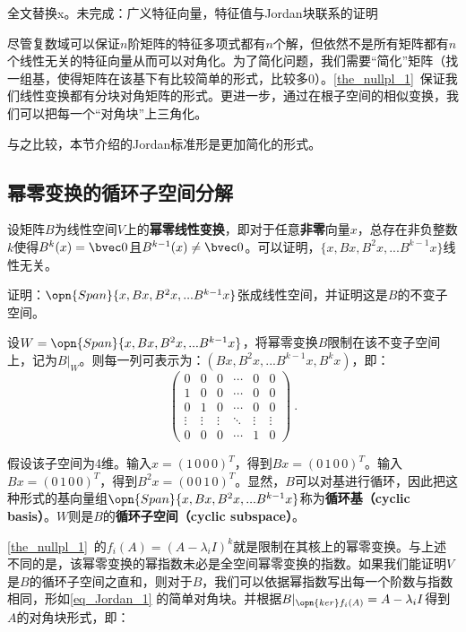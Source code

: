 

\begin{issues}
\issueDraft 全文替换x。未完成：广义特征向量，特征值与Jordan块联系的证明
\end{issues}

尽管复数域可以保证$n$阶矩阵的特征多项式都有$n$个解，但依然不是所有矩阵都有$n$个线性无关的特征向量从而可以对角化。为了简化问题，我们需要“简化”矩阵（找一组基，使得矩阵在该基下有比较简单的形式，比较多$0$）。\autoref{the_nullpl_1}~保证我们线性变换都有分块对角矩阵的形式。更进一步，通过在根子空间的相似变换，我们可以把每一个“对角块”上三角化。

与之比较，本节介绍的Jordan标准形是更加简化的形式。
\subsection{幂零变换的循环子空间分解}
设矩阵$B$为线性空间$V$上的\textbf{幂零线性变换}，即对于任意\textbf{非零}向量$x$，总存在非负整数$k$使得$B^{k}(x)=\bvec 0$且$B^{k-1}(x)\neq \bvec 0$。可以证明，$\{x,Bx,B^2x,...B^{k-1}x\}$线性无关。
\begin{exercise}{}
证明：$\opn{Span}\{x,Bx,B^2x,...B^{k-1}x\}$张成线性空间，并证明这是$B$的不变子空间。
\end{exercise}
设$W=\opn{Span}\{x,Bx,B^2x,...B^{k-1}x\}$，将幂零变换$B$限制在该不变子空间上，记为$B|_W$。则每一列可表示为：$(Bx,B^2x,...B^{k-1}x,B^kx)$，即：
\begin{equation}\label{eq_Jordan_1}
\left(\begin{array}{cccccc}
0 & 0 & 0 & \cdots & 0 & 0 \\
1 & 0 & 0 & \cdots & 0 & 0 \\
0 & 1 & 0 & \cdots & 0 & 0 \\
\vdots & \vdots & \vdots & \ddots & \vdots & \vdots \\
0 & 0 & 0 & \cdots & 1 & 0
\end{array}\right)~.
\end{equation}

假设该子空间为4维。输入$x=(1\,0\,0\,0)^T$，得到$Bx=(0\,1\,0\,0)^T$。输入$Bx=(0\,1\,0\,0)^T$，得到$B^2x=(0\,0\,1\,0)^T$。显然，$B$可以对基进行循环，因此把这种形式的基向量组$\opn{Span}\{x,Bx,B^2x,...B^{k-1}x\}$称为\textbf{循环基（cyclic basis）}。$W$则是$B$的\textbf{循环子空间（cyclic subspace）}。

\autoref{the_nullpl_1}~的$f_i(A)=(A-\lambda_i I )^k$就是限制在其核上的幂零变换。与上述不同的是，该幂零变换的幂指数未必是全空间幂零变换的指数。如果我们能证明$V$是$B$的循环子空间之直和，则对于$B$，我们可以依据幂指数写出每一个阶数与指数相同，形如\autoref{eq_Jordan_1} 的简单对角块。并根据$B|_{\opn{ker}f_i(A)}=A-\lambda_i I$得到$A$的对角块形式，即：


